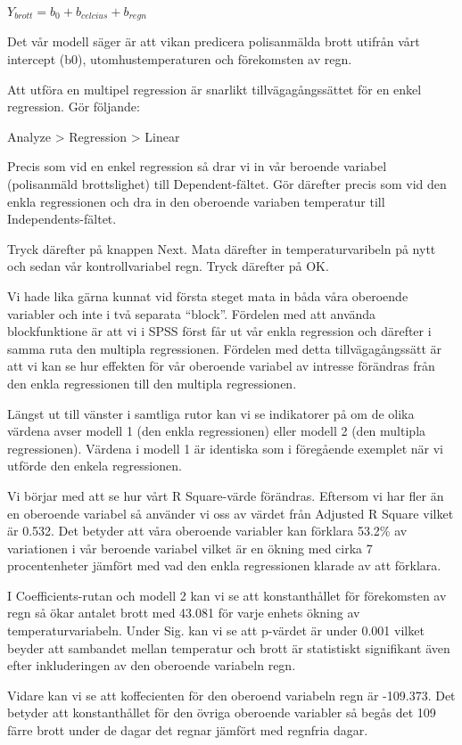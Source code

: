 \documentclass[
]{book}
\begin{document}
\(Y_{brott} = b_0 + b_{celcius} + b_{regn}\)

Det vår modell säger är att vikan predicera polisanmälda brott utifrån vårt intercept (b0), utomhustemperaturen och förekomsten av regn.

Att utföra en multipel regression är snarlikt tillvägagångssättet för en enkel regression. Gör följande:

Analyze \textgreater{} Regression \textgreater{} Linear

Precis som vid en enkel regression så drar vi in vår beroende variabel (polisanmäld brottslighet) till Dependent-fältet. Gör därefter precis som vid den enkla regressionen och dra in den oberoende variaben temperatur till Independents-fältet.

Tryck därefter på knappen Next. Mata därefter in temperaturvaribeln på nytt och sedan vår kontrollvariabel regn. Tryck därefter på OK.

Vi hade lika gärna kunnat vid första steget mata in båda våra oberoende variabler och inte i två separata ``block''. Fördelen med att använda blockfunktione är att vi i SPSS först får ut vår enkla regression och därefter i samma ruta den multipla regressionen. Fördelen med detta tillvägagångssätt är att vi kan se hur effekten för vår oberoende variabel av intresse förändras från den enkla regressionen till den multipla regressionen.

Längst ut till vänster i samtliga rutor kan vi se indikatorer på om de olika värdena avser modell 1 (den enkla regressionen) eller modell 2 (den multipla regressionen). Värdena i modell 1 är identiska som i föregående exemplet när vi utförde den enkela regressionen.

Vi börjar med att se hur vårt R Square-värde förändras. Eftersom vi har fler än en oberoende variabel så använder vi oss av värdet från Adjusted R Square vilket är 0.532. Det betyder att våra oberoende variabler kan förklara 53.2\% av variationen i vår beroende variabel vilket är en ökning med cirka 7 procentenheter jämfört med vad den enkla regressionen klarade av att förklara.

I Coefficients-rutan och modell 2 kan vi se att konstanthållet för förekomsten av regn så ökar antalet brott med 43.081 för varje enhets ökning av temperaturvariabeln. Under Sig. kan vi se att p-värdet är under 0.001 vilket beyder att sambandet mellan temperatur och brott är statistiskt signifikant även efter inkluderingen av den oberoende variabeln regn.

Vidare kan vi se att koffecienten för den oberoend variabeln regn är -109.373. Det betyder att konstanthållet för den övriga oberoende variabler så begås det 109 färre brott under de dagar det regnar jämfört med regnfria dagar.
\end{document}
